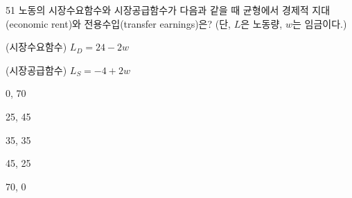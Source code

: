 \begin{question}{51}
노동의 시장수요함수와 시장공급함수가 다음과 같을 때 균형에서 경제적 지대(economic rent)와 전용수입(transfer earnings)은? (단, $L$은 노동량, $w$는 임금이다.)
\begin{framedtext}
\centering (시장수요함수) $L_{D}=24-2w$ \par
(시장공급함수) $L_{S}=-4+2w$
\end{framedtext}
\begin{choices}
  \item 0, 70
  \item 25, 45
  \item 35, 35
  \item 45, 25
  \item 70, 0
\end{choices}
\end{question}

